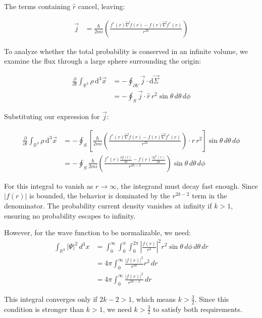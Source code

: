 The terms containing $\hat{r}$ cancel, leaving:

\begin{align}
\vec{j} &= \frac{\hbar}{2 m i}\left(\frac{f^{*}(r) \vec{\nabla} f(r)-f(r) \vec{\nabla} f^{*}(r)}{r^{2 k}}\right)
\end{align}

To analyze whether the total probability is conserved in an infinite volume, we examine the flux through a large sphere surrounding the origin:

\begin{align}
\frac{\partial}{\partial t} \int_{\mathbb{R}^{3}} \rho \, \mathrm{d}^{3} \vec{x} &= -\oint_{\partial V} \vec{j} \cdot \mathrm{d} \vec{\Sigma} \\
&= -\oint_{S} \vec{j} \cdot \hat{r} \, r^{2} \sin\theta \, d\theta \, d\phi
\end{align}

Substituting our expression for $\vec{j}$:

\begin{align}
\frac{\partial}{\partial t} \int_{\mathbb{R}^{3}} \rho \, \mathrm{d}^{3} \vec{x} &= -\oint_{S}\left[\frac{\hbar}{2 m i}\left(\frac{f^{*}(r) \vec{\nabla} f(r)-f(r) \vec{\nabla} f^{*}(r)}{r^{2 k}}\right) \cdot \hat{r} \, r^{2}\right] \sin\theta \, d\theta \, d\phi  \\
&= -\oint_{S} \frac{\hbar}{2 m i}\left(\frac{f^{*}(r) \frac{\partial f(r)}{\partial r}-f(r) \frac{\partial f^{*}(r)}{\partial r}}{r^{2 k-2}}\right) \sin\theta \, d\theta \, d\phi
\end{align}

For this integral to vanish as $r \to \infty$, the integrand must decay fast enough. Since $|f(r)|$ is bounded, the behavior is dominated by the $r^{2k-2}$ term in the denominator. The probability current density vanishes at infinity if $k > 1$, ensuring no probability escapes to infinity.

However, for the wave function to be normalizable, we need:
\begin{align}
\int_{\mathbb{R}^{3}} |\Psi|^2 \, d^3x &= \int_0^\infty \int_0^\pi \int_0^{2\pi} \left|\frac{f(r)}{r^k}\right|^2 r^2 \sin\theta \, d\phi \, d\theta \, dr \\
&= 4\pi \int_0^\infty \frac{|f(r)|^2}{r^{2k}} r^2 \, dr \\
&= 4\pi \int_0^\infty \frac{|f(r)|^2}{r^{2k-2}} \, dr
\end{align}

This integral converges only if $2k-2 > 1$, which means $k > \frac{3}{2}$. Since this condition is stronger than $k > 1$, we need $k > \frac{3}{2}$ to satisfy both requirements.

